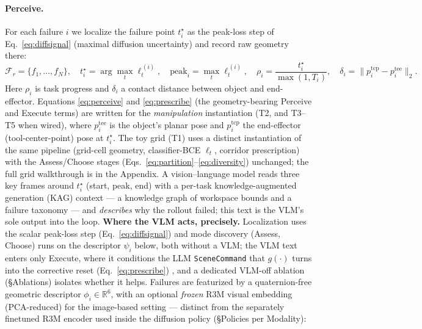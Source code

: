 \documentclass[letterpaper]{article} %
\begin{document}
\paragraph{Perceive.}
For each failure $i$ we localize the failure point $t^\star_i$ as the peak-loss step
of Eq.~\ref{eq:diffsignal} (maximal diffusion uncertainty) and record raw geometry
there:
\begin{equation}
\mathcal{F}_r=\{f_1,\dots,f_N\},
\quad
t^\star_i=\arg\max_t \ell^{\,(i)}_t,\quad
\mathrm{peak}_i=\max_t \ell^{\,(i)}_t,\quad
\rho_i=\frac{t^\star_i}{\max(1,T_i)},\quad
\delta_i=\big\|p^{\mathrm{tcp}}_i-p^{\mathrm{tee}}_i\big\|_2 .
\label{eq:perceive}
\end{equation}
Here $\rho_i$ is task progress and $\delta_i$ a contact distance between object and
end-effector. Equations \ref{eq:perceive} and \ref{eq:prescribe} (the geometry-bearing
Perceive and Execute terms) are written for the \emph{manipulation} instantiation
(T2, and T3--T5 when wired), where
$p^{\mathrm{tee}}_i$ is the object's planar pose and $p^{\mathrm{tcp}}_i$ the
end-effector (tool-center-point) pose at $t^\star_i$. The toy grid (T1) uses a
distinct instantiation of the same pipeline (grid-cell geometry, classifier-BCE
$\ell_t$, corridor prescription) with the Assess/Choose stages
(Eqs.~\ref{eq:partition}--\ref{eq:diversity}) unchanged; the full grid walkthrough is
in the Appendix. A
vision--language model \cite{bai2025qwen3vl,duan2025aha,liu2023reflect} reads three
key frames around $t^\star_i$ (start, peak, end) with a per-task knowledge-augmented
generation (KAG) context --- a knowledge graph of workspace bounds and a failure
taxonomy --- and \emph{describes} why the rollout failed; this text is the VLM's sole
output into the loop. \textbf{Where the VLM acts, precisely.} Localization uses the
scalar peak-loss step (Eq.~\ref{eq:diffsignal}) and mode discovery (Assess, Choose)
runs on the descriptor $\psi_i$ below, both without a VLM; the VLM text enters only
Execute, where it conditions the LLM \texttt{SceneCommand} that $g(\cdot)$ turns into
the corrective reset (Eq.~\ref{eq:prescribe})
\cite{driess2023palme,huang2022innermonologue,shinn2023reflexion,madaan2023selfrefine},
and a dedicated VLM-off ablation (\S Ablations) isolates whether it helps. Failures
are featurized by a quaternion-free geometric descriptor $\phi_i\in\mathbb{R}^6$,
with an optional \emph{frozen} R3M visual embedding \cite{nair2022r3m} (PCA-reduced)
for the image-based setting --- distinct from the separately finetuned R3M encoder
used inside the diffusion policy (\S Policies per Modality):
\end{document}
